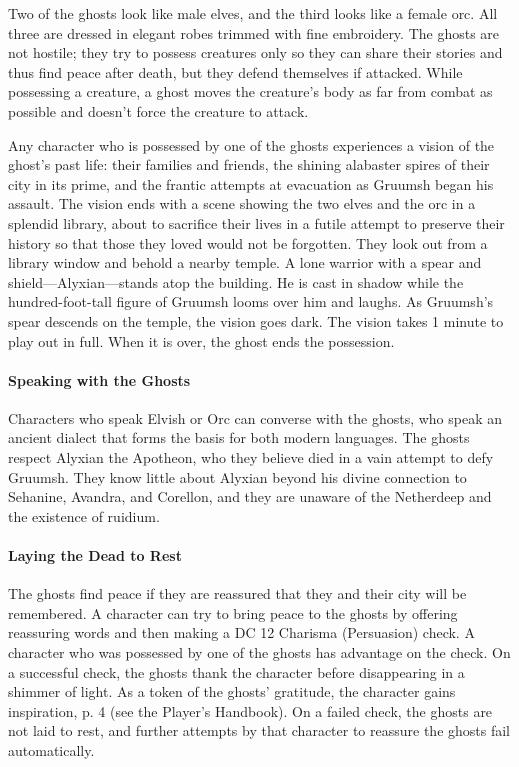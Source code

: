 \documentclass[a4paper, 11pt, bg=full, twocolumn, nooutline]{dndbook}
\begin{document}
Two of the ghosts look like male elves, and the third looks like a female orc. All three are dressed in elegant robes trimmed with fine embroidery. The ghosts are not hostile; they try to possess creatures only so they can share their stories and thus find peace after death, but they defend themselves if attacked. While possessing a creature, a ghost moves the creature's body as far from combat as possible and doesn't force the creature to attack.

Any character who is possessed by one of the ghosts experiences a vision of the ghost's past life: their families and friends, the shining alabaster spires of their city in its prime, and the frantic attempts at evacuation as Gruumsh began his assault. The vision ends with a scene showing the two elves and the orc in a splendid library, about to sacrifice their lives in a futile attempt to preserve their history so that those they loved would not be forgotten. They look out from a library window and behold a nearby temple. A lone warrior with a spear and shield---Alyxian---stands atop the building. He is cast in shadow while the hundred-foot-tall figure of Gruumsh looms over him and laughs. As Gruumsh's spear descends on the temple, the vision goes dark. The vision takes 1 minute to play out in full. When it is over, the ghost ends the possession.

\paragraph{Speaking with the Ghosts}

Characters who speak Elvish or Orc can converse with the ghosts, who speak an ancient dialect that forms the basis for both modern languages. The ghosts respect Alyxian the Apotheon, who they believe died in a vain attempt to defy Gruumsh. They know little about Alyxian beyond his divine connection to Sehanine, Avandra, and Corellon, and they are unaware of the Netherdeep and the existence of ruidium.

\paragraph{Laying the Dead to Rest}

The ghosts find peace if they are reassured that they and their city will be remembered. A character can try to bring peace to the ghosts by offering reassuring words and then making a DC 12 Charisma (Persuasion) check. A character who was possessed by one of the ghosts has advantage on the check. On a successful check, the ghosts thank the character before disappearing in a shimmer of light. As a token of the ghosts' gratitude, the character gains inspiration, p. 4 (see the Player's Handbook). On a failed check, the ghosts are not laid to rest, and further attempts by that character to reassure the ghosts fail automatically.
\end{document}
